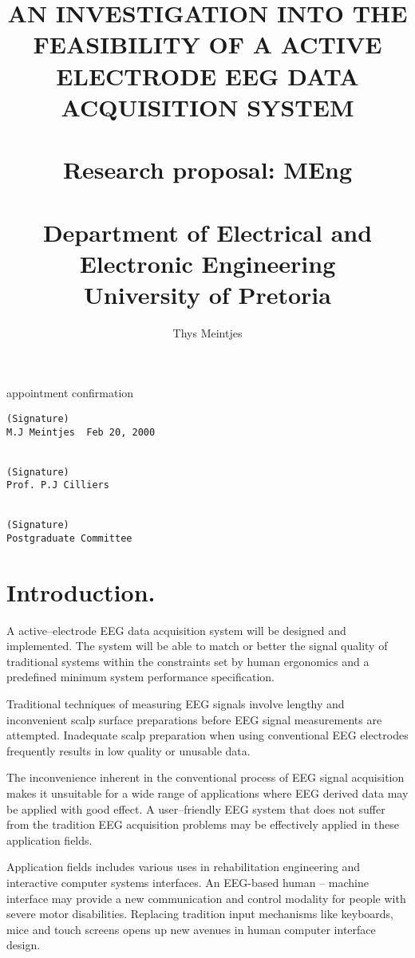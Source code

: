 \documentclass{article}
\begin{document}
\title{AN INVESTIGATION INTO THE FEASIBILITY OF A ACTIVE ELECTRODE
EEG DATA ACQUISITION SYSTEM\\
\\
Research proposal: MEng\\
\\
Department of Electrical and Electronic Engineering\\
University of Pretoria}

\author{Thys Meintjes}
	
appointment confirmation

\maketitle

\begin{verbatim}
(Signature) 
M.J Meintjes  Feb 20, 2000


(Signature) 
Prof. P.J Cilliers
		    

(Signature)
Postgraduate Committee 
\end{verbatim}


\section{Introduction.}

A active--electrode EEG data acquisition system will be designed and
implemented. The system will be able to match or better the signal
quality of traditional systems within the constraints set by human
ergonomics and a predefined minimum system performance specification.

Traditional techniques of measuring EEG signals involve lengthy and
inconvenient scalp surface preparations before EEG signal measurements
are attempted. Inadequate scalp preparation when using conventional
EEG electrodes frequently results in low quality or unusable
data. 

The inconvenience inherent in the conventional process of EEG signal
acquisition makes it unsuitable for a wide range of applications where
EEG derived data may be applied with good effect. A user--friendly EEG
system that does not suffer from the tradition EEG acquisition problems
may be effectively applied in these application fields.

Application fields includes various uses in rehabilitation engineering
and interactive computer systems interfaces. An EEG-based human --
machine interface may provide a new communication and control modality
for people with severe motor disabilities. Replacing tradition input
mechanisms like keyboards, mice and touch screens opens up new avenues
in human computer interface design.
\end{document}
